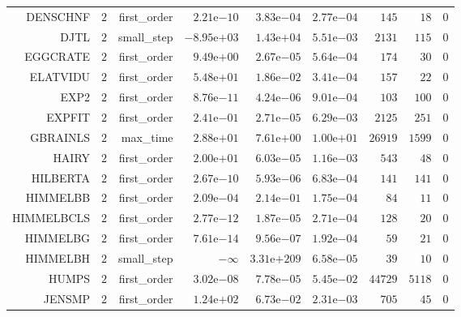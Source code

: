 \begin{longtable}{rrrrrrrrr}
DENSCHNF & \(     2\) & first\_order & \( 2.21\)e\(-10\) & \( 3.83\)e\(-04\) & \( 2.77\)e\(-04\) & \(   145\) & \(    18\) & \(     0\) \\
DJTL & \(     2\) & small\_step & \(-8.95\)e\(+03\) & \( 1.43\)e\(+04\) & \( 5.51\)e\(-03\) & \(  2131\) & \(   115\) & \(     0\) \\
EGGCRATE & \(     2\) & first\_order & \( 9.49\)e\(+00\) & \( 2.67\)e\(-05\) & \( 5.64\)e\(-04\) & \(   174\) & \(    30\) & \(     0\) \\
ELATVIDU & \(     2\) & first\_order & \( 5.48\)e\(+01\) & \( 1.86\)e\(-02\) & \( 3.41\)e\(-04\) & \(   157\) & \(    22\) & \(     0\) \\
EXP2 & \(     2\) & first\_order & \( 8.76\)e\(-11\) & \( 4.24\)e\(-06\) & \( 9.01\)e\(-04\) & \(   103\) & \(   100\) & \(     0\) \\
EXPFIT & \(     2\) & first\_order & \( 2.41\)e\(-01\) & \( 2.71\)e\(-05\) & \( 6.29\)e\(-03\) & \(  2125\) & \(   251\) & \(     0\) \\
GBRAINLS & \(     2\) & max\_time & \( 2.88\)e\(+01\) & \( 7.61\)e\(+00\) & \( 1.00\)e\(+01\) & \( 26919\) & \(  1599\) & \(     0\) \\
HAIRY & \(     2\) & first\_order & \( 2.00\)e\(+01\) & \( 6.03\)e\(-05\) & \( 1.16\)e\(-03\) & \(   543\) & \(    48\) & \(     0\) \\
HILBERTA & \(     2\) & first\_order & \( 2.67\)e\(-10\) & \( 5.93\)e\(-06\) & \( 6.83\)e\(-04\) & \(   141\) & \(   141\) & \(     0\) \\
HIMMELBB & \(     2\) & first\_order & \( 2.09\)e\(-04\) & \( 2.14\)e\(-01\) & \( 1.75\)e\(-04\) & \(    84\) & \(    11\) & \(     0\) \\
HIMMELBCLS & \(     2\) & first\_order & \( 2.77\)e\(-12\) & \( 1.87\)e\(-05\) & \( 2.71\)e\(-04\) & \(   128\) & \(    20\) & \(     0\) \\
HIMMELBG & \(     2\) & first\_order & \( 7.61\)e\(-14\) & \( 9.56\)e\(-07\) & \( 1.92\)e\(-04\) & \(    59\) & \(    21\) & \(     0\) \\
HIMMELBH & \(     2\) & small\_step & \(-\infty\) & \(3.31\)e\(+209\) & \( 6.58\)e\(-05\) & \(    39\) & \(    10\) & \(     0\) \\
HUMPS & \(     2\) & first\_order & \( 3.02\)e\(-08\) & \( 7.78\)e\(-05\) & \( 5.45\)e\(-02\) & \( 44729\) & \(  5118\) & \(     0\) \\
JENSMP & \(     2\) & first\_order & \( 1.24\)e\(+02\) & \( 6.73\)e\(-02\) & \( 2.31\)e\(-03\) & \(   705\) & \(    45\) & \(     0\) \\

\end{longtable}
